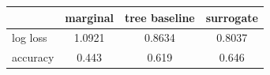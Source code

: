 \begin{tabular}{lccc}
\toprule
 & marginal & tree baseline & surrogate \\
\midrule
log loss & 1.0921 & 0.8634 & 0.8037 \\
accuracy & 0.443 & 0.619 & 0.646 \\
\bottomrule
\end{tabular}
